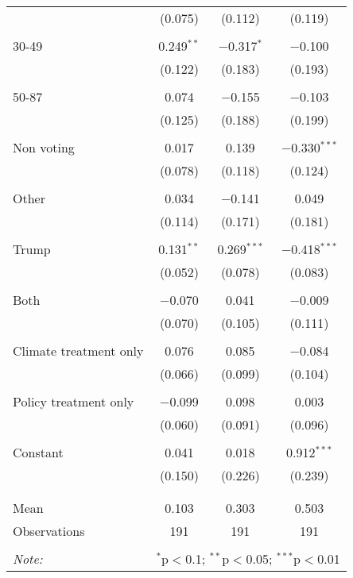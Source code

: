\begin{tabular}{@{\extracolsep{5pt}}lccc}
  & (0.075) & (0.112) & (0.119) \\ 
  & & & \\ 
 30-49 & 0.249$^{**}$ & $-$0.317$^{*}$ & $-$0.100 \\ 
  & (0.122) & (0.183) & (0.193) \\ 
  & & & \\ 
 50-87 & 0.074 & $-$0.155 & $-$0.103 \\ 
  & (0.125) & (0.188) & (0.199) \\ 
  & & & \\ 
 Non voting & 0.017 & 0.139 & $-$0.330$^{***}$ \\ 
  & (0.078) & (0.118) & (0.124) \\ 
  & & & \\ 
 Other & 0.034 & $-$0.141 & 0.049 \\ 
  & (0.114) & (0.171) & (0.181) \\ 
  & & & \\ 
 Trump & 0.131$^{**}$ & 0.269$^{***}$ & $-$0.418$^{***}$ \\ 
  & (0.052) & (0.078) & (0.083) \\ 
  & & & \\ 
 Both & $-$0.070 & 0.041 & $-$0.009 \\ 
  & (0.070) & (0.105) & (0.111) \\ 
  & & & \\ 
 Climate treatment only & 0.076 & 0.085 & $-$0.084 \\ 
  & (0.066) & (0.099) & (0.104) \\ 
  & & & \\ 
 Policy treatment only & $-$0.099 & 0.098 & 0.003 \\ 
  & (0.060) & (0.091) & (0.096) \\ 
  & & & \\ 
 Constant & 0.041 & 0.018 & 0.912$^{***}$ \\ 
  & (0.150) & (0.226) & (0.239) \\ 
  & & & \\ 
\hline \\[-1.8ex] 
Mean & 0.103 & 0.303 & 0.503 \\ 
Observations & 191 & 191 & 191 \\ 
\hline 
\hline \\[-1.8ex] 
\textit{Note:}  & \multicolumn{3}{r}{$^{*}$p$<$0.1; $^{**}$p$<$0.05; $^{***}$p$<$0.01} \\ 
\end{tabular} 
